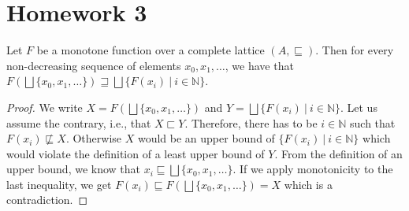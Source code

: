 








% 

\section{Homework 3}

\begin{theorem}
    Let $F$ be a monotone function over a complete lattice $(A, \sqsubseteq)$. Then for every non-decreasing sequence of elements $x_0, x_1, \ldots$, we have that $F(\bigsqcup\{x_0, x_1, \ldots\}) \sqsupseteq \bigsqcup\{F(x_i) ~|~ i \in \mathbb{N}\}$.
\end{theorem}
\begin{proof}
    We write $X = F(\bigsqcup\{x_0, x_1, \ldots\})$ and $Y = \bigsqcup\{F(x_i) ~|~ i \in \mathbb{N}\}$. Let us assume the contrary, i.e., that $X \sqsubset Y$. Therefore, there has to be $i \in \mathbb{N}$ such that $F(x_i) \not\sqsubseteq X$. Otherwise $X$ would be an upper bound of $\{F(x_i) ~|~ i \in \mathbb{N}\}$ which would violate the definition of a least upper bound of $Y$. From the definition of an upper bound, we know that $x_i \sqsubseteq \bigsqcup\{x_0, x_1, \ldots\}$. If we apply monotonicity to the last inequality, we get $F(x_i) \sqsubseteq F(\bigsqcup\{x_0, x_1, \ldots\}) = X$ which is a contradiction.
\end{proof}

